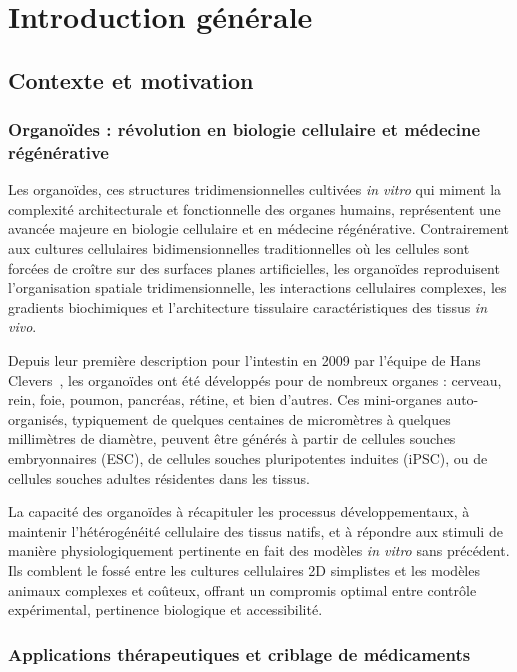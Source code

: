 
\chapter{Introduction générale}

\section{Contexte et motivation}

\subsection{Organoïdes : révolution en biologie cellulaire et médecine régénérative}

Les organoïdes, ces structures tridimensionnelles cultivées \textit{in vitro} qui miment la complexité architecturale et fonctionnelle des organes humains, représentent une avancée majeure en biologie cellulaire et en médecine régénérative. Contrairement aux cultures cellulaires bidimensionnelles traditionnelles où les cellules sont forcées de croître sur des surfaces planes artificielles, les organoïdes reproduisent l'organisation spatiale tridimensionnelle, les interactions cellulaires complexes, les gradients biochimiques et l'architecture tissulaire caractéristiques des tissus \textit{in vivo}.

Depuis leur première description pour l'intestin en 2009 par l'équipe de Hans Clevers~\cite{Sato2009}, les organoïdes ont été développés pour de nombreux organes : cerveau, rein, foie, poumon, pancréas, rétine, et bien d'autres. Ces mini-organes auto-organisés, typiquement de quelques centaines de micromètres à quelques millimètres de diamètre, peuvent être générés à partir de cellules souches embryonnaires (ESC), de cellules souches pluripotentes induites (iPSC), ou de cellules souches adultes résidentes dans les tissus.

La capacité des organoïdes à récapituler les processus développementaux, à maintenir l'hétérogénéité cellulaire des tissus natifs, et à répondre aux stimuli de manière physiologiquement pertinente en fait des modèles \textit{in vitro} sans précédent. Ils comblent le fossé entre les cultures cellulaires 2D simplistes et les modèles animaux complexes et coûteux, offrant un compromis optimal entre contrôle expérimental, pertinence biologique et accessibilité.

\subsection{Applications thérapeutiques et criblage de médicaments}

